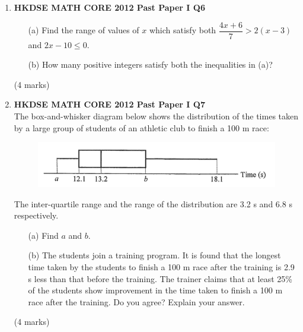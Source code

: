 \documentclass[12pt]{article}
\begin{document}
\begin{enumerate}
	\item \textbf{HKDSE MATH CORE 2012 Past Paper I Q6}
	\begin{enumerate}
		\item [(a)] Find the range of values of $x$ which satisfy both $\dfrac{4x+6}{7} > 2(x-3)$ and $2x - 10\leq 0$.
		\item [(b)] How many positive integers satisfy both the inequalities in (a)?
	\end{enumerate}	
	(4 marks)

	\item \textbf{HKDSE MATH CORE 2012 Past Paper I Q7}\\
	The box-and-whisker diagram below shows the distribution of the times taken by a large group of students of an athletic club to finish a 100 m race:

	\begin{figure}[H]
		\centering
		\includegraphics[width = .5\linewidth]{2012Figure1.0}
	\end{figure}

	The inter-quartile range and the range of the distribution are 3.2 s and 6.8 s respectively.

	\begin{enumerate}
		\item [(a)] Find $a$ and $b$.
		\item [(b)] The students join a training program. It is found that the longest time taken by the students to finish a 100 m race after the training is 2.9 s less than that before the training. The trainer claims that at least 25\% of the students show improvement in the time taken to finish a 100 m race after the training. Do you agree? Explain your answer.
	\end{enumerate}
	(4 marks)


\end{enumerate}
\end{document}
